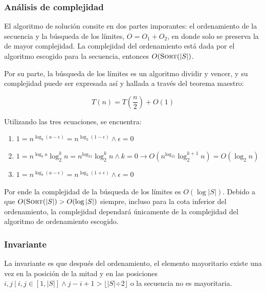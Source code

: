 \documentclass[letter]{article}
\begin{document}
\subsubsection{Análisis de complejidad} \label{algoritmos:dividir:complejidad}

El algoritmo de solución consite en dos partes imporantes: el ordenamiento de la secuencia y la búsqueda de los límites, $O=O_1+O_2$, en donde solo se preserva la de mayor complejidad. La complejidad del ordenamiento está dada por el algoritmo escogido para la secuencia, entonces $O(\Call{Sort}{|S|}$. \par

Por su parte, la búsqueda de los límites es un algoritmo dividir y vencer, y su complejidad puede ser expresada así y hallada a través del teorema maestro: \par

\[ T(n) = T(\frac{n}{2}) + O(1) \]

Utilizando las tres ecuaciones, se encuentra:

\begin{enumerate}
    \item $1 = n^{\log_b(a-\epsilon)} = n^{\log_2(1-\epsilon)} \land \epsilon = 0$
    \item $1 = n^{\log_ba} \log_2^kn = n^{\log_21} \log_2^kn \land k = 0 \rightarrow O(n^{\log_21} \log_2^{k+1}n) = O(\log_2n)$
    \item $1 = n^{\log_b(a-\epsilon)} = n^{\log_2(1+\epsilon)} \land \epsilon = 0$
\end{enumerate}

Por ende la complejidad de la búsqueda de los límites es $O(\log |S|)$. Debido a que $O(\Call{Sort}{|S|} > O(\log |S|)$ siempre, incluso para la cota inferior del ordenamiento, la complejidad dependará únicamente de la complejidad del algoritmo de ordenamiento escogido.

\subsubsection{Invariante} \label{algoritmos:dividir:invariante}

La invariante es que después del ordenamiento, el elemento mayoritario existe una vez en la posición de la mitad y en las posiciones $i,j ~|~ i,j \in [1,|S|] \land j-i+1> \lfloor |S| \div 2 \rfloor$ o la secuencia no es mayoritaria.
\end{document}

